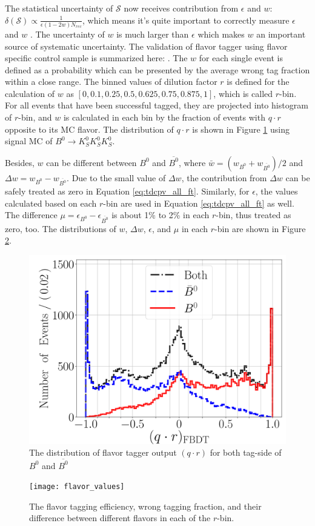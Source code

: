 The statistical uncertainty of $\mathcal{S}$ now receives contribution from $\epsilon$ and $w$: $\delta(\mathcal{S}) \propto \frac{1}{\epsilon (1-2w)N_{rec}}$, which means it's quite important to correctly measure $\epsilon$ and $w$ . The uncertainty of $w$ is much larger than $\epsilon$ which makes $w$ an important source of systematic uncertainty. The validation of flavor tagger using flavor specific control sample is summarized here: \cite{flavortagger}. The $w$ for each single event is defined as a probability which can be presented by the average wrong tag fraction within a close range. The binned values of dilution factor $r$ is defined for the calculation of $w$ as $[0,0.1,0.25,0.5,0.625,0.75,0.875,1]$, which is called $r$-bin. For all events that have been successful tagged, they are projected into histogram of $r$-bin, and $w$ is calculated in each bin by the fraction of events with $q\cdot r$ opposite to its MC flavor. The distribution of $q\cdot r$ is shown in Figure \ref{fig:ft_qr} using signal MC of $B^0 \to K_S^0  K_S^0  K_S^0$. 

Besides, $w$ can be different between $B^0$ and $\overline{B^0}$, where
$\bar{w} = (w_{B^0}+w_{\overline{B^0}})/2$ and $\Delta w = w_{B^0}-w_{\overline{B^0}}$. Due to the small value of $\Delta w$, the contribution from $\Delta w$ can be safely treated as zero in Equation \ref{eq:tdcpv_all_ft}. Similarly, for $\epsilon$, the values calculated based on each $r$-bin are used in Equation \ref{eq:tdcpv_all_ft} as well. The difference $\mu = \epsilon_{B^0}-\epsilon_{\overline{B^0}} $ is about 1\% to 2\% in each $r$-bin, thus treated as zero, too. The distributions of $w$, $\Delta w$, $\epsilon$, and $\mu$ in each $r$-bin are shown in Figure \ref{fig:ft_wtag}.
 \begin{figure}[H]
 	\centering
 	\includegraphics[width=0.7\linewidth]{figures/qr}
 	\caption{The distribution of flavor tagger output $(q\cdot r)$ for both tag-side of $B^0$ and $\overline{B^0}$}
 	\label{fig:ft_qr}
 	\end{figure}
 \begin{figure}[htpb]
 	\texttt{[image: flavor\_values]}
 	\caption{The flavor tagging efficiency, wrong tagging fraction, and their difference between different flavors in each of the $r$-bin.}
 	\label{fig:ft_wtag}
 \end{figure}

